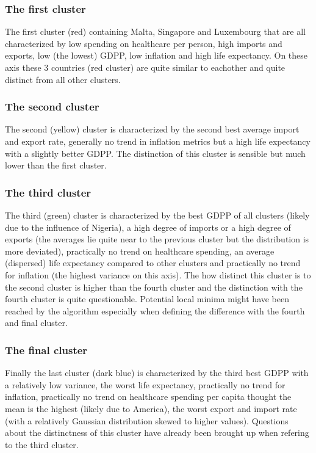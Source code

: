 \documentclass[12pt, a4paper]{article}
\begin{document}
\subsubsection{The first cluster}
The first cluster (red) containing Malta, Singapore and Luxembourg that are all characterized by low spending on healthcare per person, high imports and exports, low (the lowest) GDPP, low inflation and high life expectancy. On these axis these 3 countries (red cluster) are quite similar to eachother and quite distinct from all other clusters.

\subsubsection{The second cluster}
The second (yellow) cluster is characterized by the second best average import and export rate, generally no trend in inflation metrics but a high life expectancy with a slightly better GDPP. The distinction of this cluster is sensible but much lower than the first cluster.

\subsubsection{The third cluster}
The third (green) cluster is characterized by the best GDPP of all clusters (likely due to the influence of Nigeria), a high degree of imports or a high degree of exports (the averages lie quite near to the previous cluster but the distribution is more deviated), practically no trend on healthcare spending, an average (dispersed) life expectancy compared to other clusters and practically no trend for inflation (the highest variance on this axis). The how distinct this cluster is to the second cluster is higher than the fourth cluster and the distinction with the fourth cluster is quite questionable. Potential local minima might have been reached by the algorithm especially when defining the difference with the fourth and final cluster.

\subsubsection{The final cluster}
Finally the last cluster (dark blue) is characterized by the third best GDPP with a relatively low variance, the worst life expectancy, practically no trend for inflation, practically no trend on healthcare spending per capita thought the mean is the highest (likely due to America), the worst export and import rate (with a relatively Gaussian distribution skewed to higher values). Questions about the distinctness of this cluster have already been brought up when refering to the third cluster.
\newline
\end{document}
